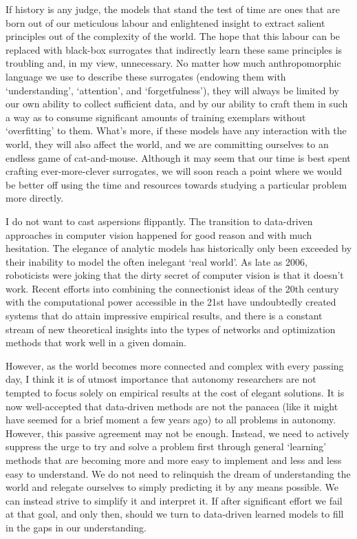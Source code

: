 If history is any judge, the models that stand the test of time are ones that are born out of our meticulous labour and enlightened insight to extract salient principles out of the complexity of the world. The hope that this labour can be replaced with black-box surrogates that indirectly learn these same principles is troubling and, in my view, unnecessary. No matter how much anthropomorphic language we use to describe these surrogates (endowing them with `understanding', `attention', and `forgetfulness'), they will always be limited by our own ability to collect sufficient data, and by our ability to craft them in such a way as to consume significant amounts of training exemplars without `overfitting' to them. What's more, if these models have any interaction with the world, they will also affect the world, and we are committing ourselves to an endless game of cat-and-mouse. Although it may seem that our time is best spent crafting ever-more-clever surrogates, we will soon reach a point where we would be better off using the time and resources towards studying a particular problem more directly.

I do not want to cast aspersions flippantly.  The transition to data-driven approaches in computer vision happened for good reason and with much hesitation. The elegance of analytic models has historically only been exceeded by their inability to model the often inelegant `real world'. As late as 2006, roboticists were joking that the dirty secret of computer vision is that it doesn't work. Recent efforts into combining the connectionist ideas of the 20th century with the computational power accessible in the 21st have undoubtedly created systems that do attain impressive empirical results, and there is a constant stream of new theoretical insights into the types of networks and optimization methods that work well in a given domain.

However, as the world becomes more connected and complex with every passing day, I think it is of utmost importance that autonomy researchers are not tempted to focus solely on empirical results at the cost of elegant solutions. It is now well-accepted that data-driven methods are not the panacea (like it might have seemed for a brief moment a few years ago) to all problems in autonomy. However, this passive agreement may not be enough. Instead, we need to actively suppress the urge to try and solve a problem first through general `learning' methods that are becoming more and more easy to implement and less and less easy to understand.  We do not need to relinquish the dream of understanding the world and relegate ourselves to simply predicting it by any means possible. We can instead strive to simplify it and interpret it. If after significant effort we fail at that goal, and only then, should we turn to data-driven learned models to fill in the gaps in our understanding.

